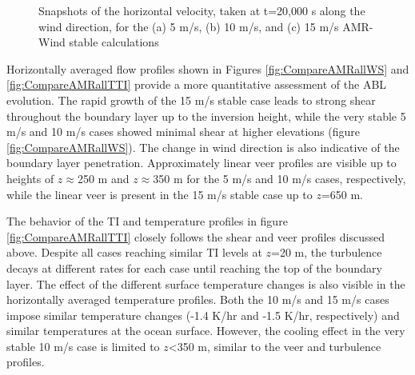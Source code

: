 \begin{figure}[hbt!]
  \centering
  \caption{ \label{fig:SnapshotsSide} Snapshots of the horizontal
    velocity, taken at t=20,000 s along the wind direction, for
    the (a) 5 m/s, (b) 10 m/s, and (c) 15 m/s AMR-Wind stable
    calculations }

\end{figure}

Horizontally averaged flow profiles shown in Figures
\ref{fig:CompareAMRallWS} and \ref{fig:CompareAMRallTTI} provide a
more quantitative assessment of the ABL evolution.  The rapid growth
of the 15 m/s stable case leads to strong shear throughout the
boundary layer up to the inversion height, while the very stable 5 m/s
and 10 m/s cases showed minimal shear at higher elevations (figure \ref{fig:CompareAMRallWS}).  The
change in wind direction is also indicative of the boundary layer
penetration.  Approximately linear veer profiles are visible up to
heights of $z\approx$250 m and $z\approx$350 m for the 5 m/s and 10
m/s cases, respectively, while the linear veer is present in the 15
m/s stable case up to $z$=650 m.

The behavior of the TI and temperature profiles in figure
\ref{fig:CompareAMRallTTI} closely follows the shear and veer profiles
discussed above.  Despite all cases reaching similar TI levels at
$z$=20 m, the turbulence decays at different rates for each case until
reaching the top of the boundary layer.  The effect of the different
surface temperature changes is also visible in the horizontally
averaged temperature profiles.  Both the 10 m/s and 15 m/s cases impose
similar temperature changes (-1.4 K/hr and -1.5 K/hr, respectively)
and similar temperatures at the ocean surface.  However, the
cooling effect in the very stable 10 m/s case is limited to $z$<350
m, similar to the veer and turbulence profiles.


